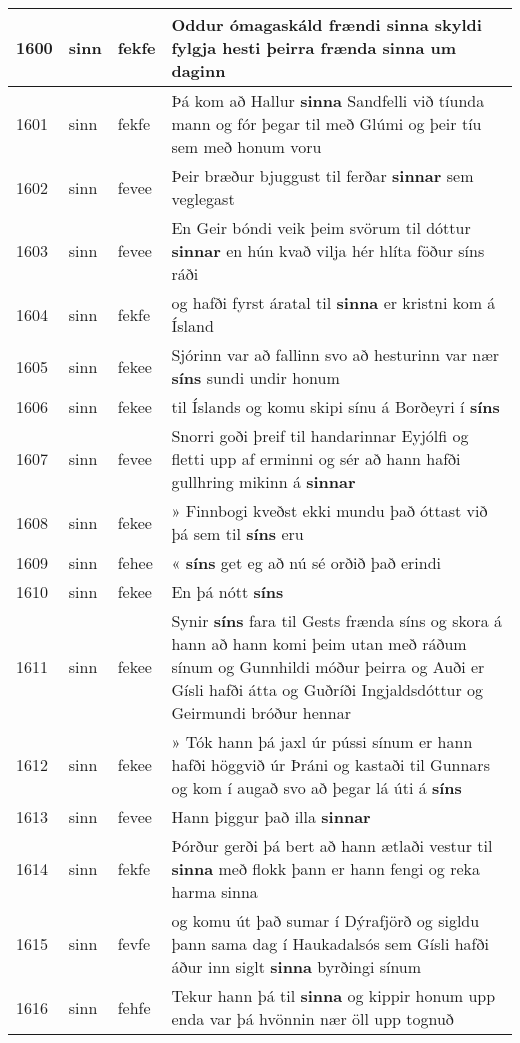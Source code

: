 \documentclass{article}
\begin{document}
\begin{longtable}{p{1cm}|p{1cm}|p{1cm}|p{13cm}}
\hline
1600&sinn&fekfe&Oddur ómagaskáld frændi \textbf{sinna} skyldi fylgja hesti þeirra frænda sinna um daginn\\
\hline
1601&sinn&fekfe&Þá kom að Hallur \textbf{sinna} Sandfelli við tíunda mann og fór þegar til með Glúmi og þeir tíu sem með honum voru\\
\hline
1602&sinn&fevee&Þeir bræður bjuggust til ferðar \textbf{sinnar} sem veglegast\\
\hline
1603&sinn&fevee&En Geir bóndi veik þeim svörum til dóttur \textbf{sinnar} en hún kvað vilja hér hlíta föður síns ráði\\
\hline
1604&sinn&fekfe&og hafði fyrst áratal til \textbf{sinna} er kristni kom á Ísland\\
\hline
1605&sinn&fekee&Sjórinn var að fallinn svo að hesturinn var nær \textbf{síns} sundi undir honum\\
\hline
1606&sinn&fekee&til Íslands og komu skipi sínu á Borðeyri í \textbf{síns} \\
\hline
1607&sinn&fevee&Snorri goði þreif til handarinnar Eyjólfi og fletti upp af erminni og sér að hann hafði gullhring mikinn á \textbf{sinnar} \\
\hline
1608&sinn&fekee&» Finnbogi kveðst ekki mundu það óttast við þá sem til \textbf{síns} eru\\
\hline
1609&sinn&fehee&« \textbf{síns} get eg að nú sé orðið það erindi\\
\hline
1610&sinn&fekee&En þá nótt \textbf{síns} \\
\hline
1611&sinn&fekee&Synir \textbf{síns} fara til Gests frænda síns og skora á hann að hann komi þeim utan með ráðum sínum og Gunnhildi móður þeirra og Auði er Gísli hafði átta og Guðríði Ingjaldsdóttur og Geirmundi bróður hennar\\
\hline
1612&sinn&fekee&» Tók hann þá jaxl úr pússi sínum er hann hafði höggvið úr Þráni og kastaði til Gunnars og kom í augað svo að þegar lá úti á \textbf{síns} \\
\hline
1613&sinn&fevee&Hann þiggur það illa \textbf{sinnar} \\
\hline
1614&sinn&fekfe&Þórður gerði þá bert að hann ætlaði vestur til \textbf{sinna} með flokk þann er hann fengi og reka harma sinna\\
\hline
1615&sinn&fevfe&og komu út það sumar í Dýrafjörð og sigldu þann sama dag í Haukadalsós sem Gísli hafði áður inn siglt \textbf{sinna} byrðingi sínum\\
\hline
1616&sinn&fehfe&Tekur hann þá til \textbf{sinna} og kippir honum upp enda var þá hvönnin nær öll upp tognuð\\

\end{longtable}
\end{document}
